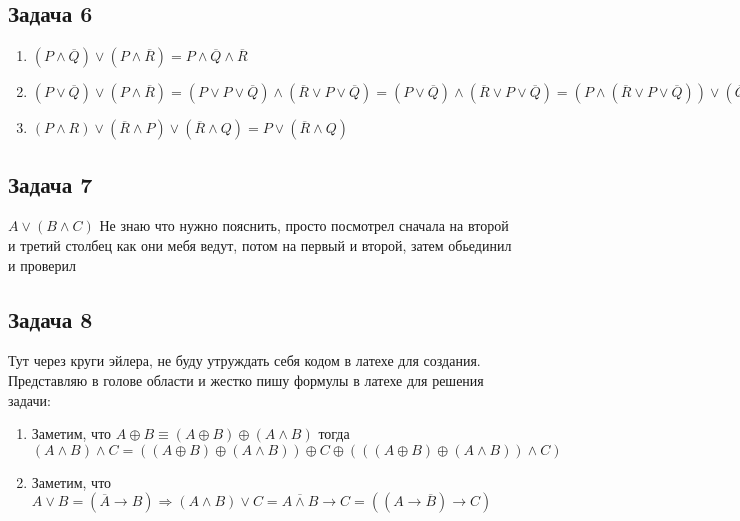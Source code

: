 \documentclass[a4paper,12pt]{article}
\begin{document}
\subsection{Задача 6}
\begin{enumerate}
    \item $(P\land\overline{Q}) \lor (P\land \overline{R}) = P \land \overline{Q} \land \overline{R}$
    \item $(P\lor \overline{Q}) \lor (P\land \overline{R}) = (P\lor P \lor \overline{Q})\land (\overline{R} \lor P \lor \overline{Q})=(P\lor \overline{Q})\land (\overline{R}\lor P \lor \overline{Q}) = (P \land (\overline{R}\lor P \lor \overline{Q}))\lor(\overline{Q} \land (\overline{R}\lor P \lor \overline{Q})) = P\lor \overline{Q}$
    \item $(P\land R) \lor (\overline{R}\land P) \lor (\overline{R} \land Q)= P \lor (\overline{R}\land Q)$
\end{enumerate}

\subsection{Задача 7}
$A\lor(B\land C)$ Не знаю что нужно пояснить, просто посмотрел сначала на второй и третий столбец как они мебя ведут, потом на первый и второй, затем обьединил и проверил

\subsection{Задача 8}
Тут через круги эйлера, не буду утруждать себя кодом в латехе для создания. Представляю в голове области и жестко пишу формулы в латехе для решения задачи:
\begin{enumerate}
    \item Заметим, что $A\oplus B \equiv (A\oplus B)\oplus (A\land B)$ тогда $(A\land B)\land C = ((A \oplus B) \oplus (A \land B)) \oplus C \oplus (((A \oplus B) \oplus (A \land B)) \land C)$ 
    \item Заметим, что $A \lor B = (\overline{A} \to B)\Rightarrow (A\land B)\lor C = \overline{A\land B} \to C = ((A \to \overline{B}) \to C)$
\end{enumerate}
\end{document}
